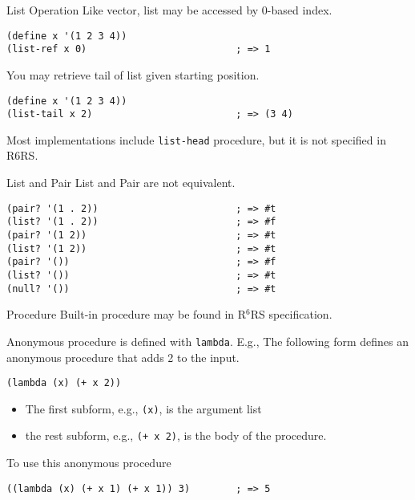 \documentclass[presentation]{beamer}
\begin{document}
\begin{frame}[fragile,label={sec:orgheadline36}]{List Operation}
 Like vector, list may be accessed by 0-based index.

\begin{verbatim}
(define x '(1 2 3 4))
(list-ref x 0)                          ; => 1
\end{verbatim}

You may retrieve tail of list given starting position.

\begin{verbatim}
(define x '(1 2 3 4))
(list-tail x 2)                         ; => (3 4)
\end{verbatim}

Most implementations include \texttt{list-head} procedure, but it is not
specified in R6RS.
\end{frame}

\begin{frame}[fragile,label={sec:orgheadline37}]{List and Pair}
 List and Pair are not equivalent.

\begin{verbatim}
(pair? '(1 . 2))                        ; => #t
(list? '(1 . 2))                        ; => #f
(pair? '(1 2))                          ; => #t
(list? '(1 2))                          ; => #t
(pair? '())                             ; => #f
(list? '())                             ; => #t
(null? '())                             ; => #t
\end{verbatim}
\end{frame}

\begin{frame}[fragile,label={sec:orgheadline38}]{Procedure}
 Built-in procedure may be found in R\(^{\text{6}}\)RS specification.

Anonymous procedure is defined with \texttt{lambda}.  E.g., The following
form defines an anonymous procedure that adds 2 to the input.

\begin{verbatim}
(lambda (x) (+ x 2))
\end{verbatim}

\begin{itemize}
\item The first subform, e.g., \texttt{(x)}, is the argument list
\item the rest subform, e.g., \texttt{(+ x 2)}, is the body of the procedure.
\end{itemize}


To use this anonymous procedure

\begin{verbatim}
((lambda (x) (+ x 1) (+ x 1)) 3)        ; => 5
\end{verbatim}
\end{frame}
\end{document}
